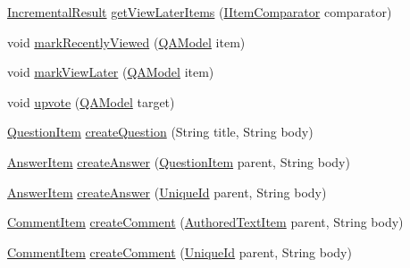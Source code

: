 \begin{DoxyCompactItemize}
\item 
\hyperlink{classcom_1_1ualberta_1_1team17_1_1datamanager_1_1_incremental_result}{Incremental\+Result} \hyperlink{classcom_1_1ualberta_1_1team17_1_1controller_1_1_q_a_controller_af35da5e96f2c397c58c184c43a728964}{get\+View\+Later\+Items} (\hyperlink{interfacecom_1_1ualberta_1_1team17_1_1datamanager_1_1_i_item_comparator}{I\+Item\+Comparator} comparator)
\item 
void \hyperlink{classcom_1_1ualberta_1_1team17_1_1controller_1_1_q_a_controller_a6edb6edbd1fc60da1ed95852c71b7225}{mark\+Recently\+Viewed} (\hyperlink{classcom_1_1ualberta_1_1team17_1_1_q_a_model}{Q\+A\+Model} item)
\item 
void \hyperlink{classcom_1_1ualberta_1_1team17_1_1controller_1_1_q_a_controller_ad2d7c7672a64d36d25c948935c8d6fc0}{mark\+View\+Later} (\hyperlink{classcom_1_1ualberta_1_1team17_1_1_q_a_model}{Q\+A\+Model} item)
\item 
void \hyperlink{classcom_1_1ualberta_1_1team17_1_1controller_1_1_q_a_controller_aedad001a4453442123bdae57759bccf6}{upvote} (\hyperlink{classcom_1_1ualberta_1_1team17_1_1_q_a_model}{Q\+A\+Model} target)
\item 
\hyperlink{classcom_1_1ualberta_1_1team17_1_1_question_item}{Question\+Item} \hyperlink{classcom_1_1ualberta_1_1team17_1_1controller_1_1_q_a_controller_a696d71d48a5a4393df7784e6ec881f78}{create\+Question} (String title, String body)
\item 
\hyperlink{classcom_1_1ualberta_1_1team17_1_1_answer_item}{Answer\+Item} \hyperlink{classcom_1_1ualberta_1_1team17_1_1controller_1_1_q_a_controller_aebdc84174e0eb63105c8791f2d275a5a}{create\+Answer} (\hyperlink{classcom_1_1ualberta_1_1team17_1_1_question_item}{Question\+Item} parent, String body)
\item 
\hyperlink{classcom_1_1ualberta_1_1team17_1_1_answer_item}{Answer\+Item} \hyperlink{classcom_1_1ualberta_1_1team17_1_1controller_1_1_q_a_controller_a96f652dc6c848957826887376ab1427e}{create\+Answer} (\hyperlink{classcom_1_1ualberta_1_1team17_1_1_unique_id}{Unique\+Id} parent, String body)
\item 
\hyperlink{classcom_1_1ualberta_1_1team17_1_1_comment_item}{Comment\+Item} \hyperlink{classcom_1_1ualberta_1_1team17_1_1controller_1_1_q_a_controller_aa826cc983511fa9ae88a091e31999c9a}{create\+Comment} (\hyperlink{classcom_1_1ualberta_1_1team17_1_1_authored_text_item}{Authored\+Text\+Item} parent, String body)
\item 
\hyperlink{classcom_1_1ualberta_1_1team17_1_1_comment_item}{Comment\+Item} \hyperlink{classcom_1_1ualberta_1_1team17_1_1controller_1_1_q_a_controller_aee8d4ff3ca64c2cf04ecb5e391a0414a}{create\+Comment} (\hyperlink{classcom_1_1ualberta_1_1team17_1_1_unique_id}{Unique\+Id} parent, String body)

\end{DoxyCompactItemize}
